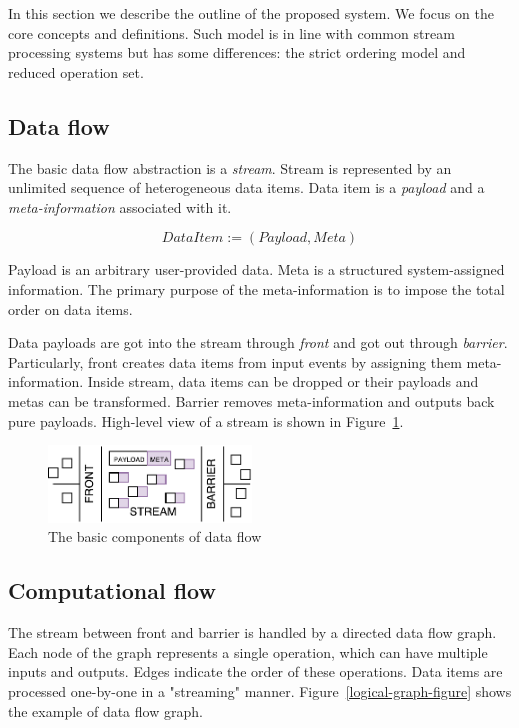 
\label {fs-model}
In this section we describe the outline of the proposed system. We focus on the core concepts and definitions. Such model is in line with common stream processing systems but has some differences: the strict ordering model and reduced operation set.

\subsection{Data flow}

The basic data flow abstraction is a {\it stream}. Stream is represented by an unlimited sequence of heterogeneous data items. Data item is a {\it payload} and a {\it meta-information} associated with it. 

\[DataItem := (Payload, Meta)\]

Payload is an arbitrary user-provided data. Meta is a structured system-assigned information. The primary purpose of the meta-information is to impose the total order on data items. 

Data payloads are got into the stream through {\it front} and got out through {\it barrier}. Particularly, front creates data items from input events by assigning them meta-information. Inside stream, data items can be dropped or their payloads and metas can be transformed. Barrier removes meta-information and outputs back pure payloads. High-level view of a stream is shown in Figure~\ref{stream}.

\begin{figure}[htbp]
  \centering
  \includegraphics[width=0.48\textwidth]{pics/stream}
  \caption{The basic components of data flow}
  \label {stream}
\end{figure}

\subsection{Computational flow}

The stream between front and barrier is handled by a directed data flow graph. Each node of the graph represents a single operation, which can have multiple inputs and outputs. Edges indicate the order of these operations. Data items are processed one-by-one in a "streaming" manner. Figure~\ref{logical-graph-figure} shows the example of data flow graph.

